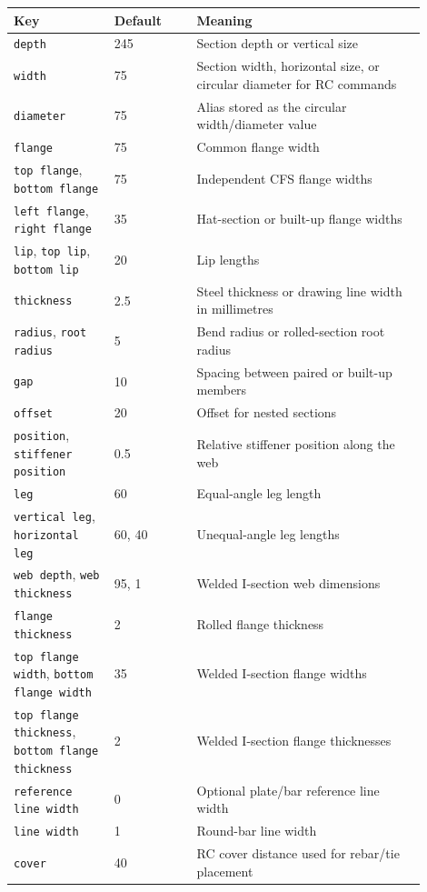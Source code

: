 \documentclass[10pt]{article}
\newcommand{\keyname}[1]{\texttt{#1}}
\begin{document}
\begin{longtable}{p{0.22\linewidth}p{0.18\linewidth}p{0.50\linewidth}}
\toprule
Key & Default & Meaning \\
\midrule
\keyname{depth} & 245 & Section depth or vertical size \\
\keyname{width} & 75 & Section width, horizontal size, or circular diameter for RC commands \\
\keyname{diameter} & 75 & Alias stored as the circular width/diameter value \\
\keyname{flange} & 75 & Common flange width \\
\keyname{top flange}, \keyname{bottom flange} & 75 & Independent CFS flange widths \\
\keyname{left flange}, \keyname{right flange} & 35 & Hat-section or built-up flange widths \\
\keyname{lip}, \keyname{top lip}, \keyname{bottom lip} & 20 & Lip lengths \\
\keyname{thickness} & 2.5 & Steel thickness or drawing line width in millimetres \\
\keyname{radius}, \keyname{root radius} & 5 & Bend radius or rolled-section root radius \\
\keyname{gap} & 10 & Spacing between paired or built-up members \\
\keyname{offset} & 20 & Offset for nested sections \\
\keyname{position}, \keyname{stiffener position} & 0.5 & Relative stiffener position along the web \\
\keyname{leg} & 60 & Equal-angle leg length \\
\keyname{vertical leg}, \keyname{horizontal leg} & 60, 40 & Unequal-angle leg lengths \\
\keyname{web depth}, \keyname{web thickness} & 95, 1 & Welded I-section web dimensions \\
\keyname{flange thickness} & 2 & Rolled flange thickness \\
\keyname{top flange width}, \keyname{bottom flange width} & 35 & Welded I-section flange widths \\
\keyname{top flange thickness}, \keyname{bottom flange thickness} & 2 & Welded I-section flange thicknesses \\
\keyname{reference line width} & 0 & Optional plate/bar reference line width \\
\keyname{line width} & 1 & Round-bar line width \\
\keyname{cover} & 40 & RC cover distance used for rebar/tie placement \\

\end{longtable}
\end{document}
